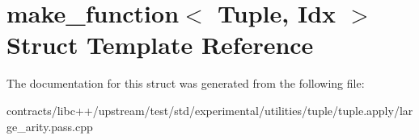 \hypertarget{structmake__function}{}\section{make\+\_\+function$<$ Tuple, Idx $>$ Struct Template Reference}
\label{structmake__function}


The documentation for this struct was generated from the following file\+:\begin{DoxyCompactItemize}
\item 
contracts/libc++/upstream/test/std/experimental/utilities/tuple/tuple.\+apply/large\+\_\+arity.\+pass.\+cpp\end{DoxyCompactItemize}
